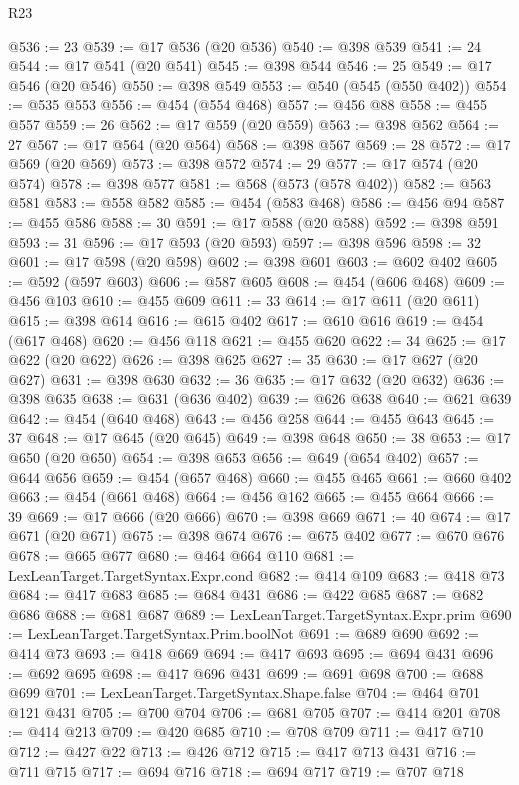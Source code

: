 \begin{lexlean}{R23}
\begin{coremodule}
{{{{{{{{{{{{{{{{{{{{{{{{{{{{{{{{{{{{{{{{{{{{{{{{{{{{{{{{{{{{{{{{{{{{{{{{{{{{{{{{{{{{{{{{{{{{{@536 := 23
@539 := @17 @536 (@20 @536)
@540 := @398 @539
@541 := 24
@544 := @17 @541 (@20 @541)
@545 := @398 @544
@546 := 25
@549 := @17 @546 (@20 @546)
@550 := @398 @549
@553 := @540 (@545 (@550 @402))
@554 := @535 @553
@556 := @454 (@554 @468)
@557 := @456 @88
@558 := @455 @557
@559 := 26
@562 := @17 @559 (@20 @559)
@563 := @398 @562
@564 := 27
@567 := @17 @564 (@20 @564)
@568 := @398 @567
@569 := 28
@572 := @17 @569 (@20 @569)
@573 := @398 @572
@574 := 29
@577 := @17 @574 (@20 @574)
@578 := @398 @577
@581 := @568 (@573 (@578 @402))
@582 := @563 @581
@583 := @558 @582
@585 := @454 (@583 @468)
@586 := @456 @94
@587 := @455 @586
@588 := 30
@591 := @17 @588 (@20 @588)
@592 := @398 @591
@593 := 31
@596 := @17 @593 (@20 @593)
@597 := @398 @596
@598 := 32
@601 := @17 @598 (@20 @598)
@602 := @398 @601
@603 := @602 @402
@605 := @592 (@597 @603)
@606 := @587 @605
@608 := @454 (@606 @468)
@609 := @456 @103
@610 := @455 @609
@611 := 33
@614 := @17 @611 (@20 @611)
@615 := @398 @614
@616 := @615 @402
@617 := @610 @616
@619 := @454 (@617 @468)
@620 := @456 @118
@621 := @455 @620
@622 := 34
@625 := @17 @622 (@20 @622)
@626 := @398 @625
@627 := 35
@630 := @17 @627 (@20 @627)
@631 := @398 @630
@632 := 36
@635 := @17 @632 (@20 @632)
@636 := @398 @635
@638 := @631 (@636 @402)
@639 := @626 @638
@640 := @621 @639
@642 := @454 (@640 @468)
@643 := @456 @258
@644 := @455 @643
@645 := 37
@648 := @17 @645 (@20 @645)
@649 := @398 @648
@650 := 38
@653 := @17 @650 (@20 @650)
@654 := @398 @653
@656 := @649 (@654 @402)
@657 := @644 @656
@659 := @454 (@657 @468)
@660 := @455 @465
@661 := @660 @402
@663 := @454 (@661 @468)
@664 := @456 @162
@665 := @455 @664
@666 := 39
@669 := @17 @666 (@20 @666)
@670 := @398 @669
@671 := 40
@674 := @17 @671 (@20 @671)
@675 := @398 @674
@676 := @675 @402
@677 := @670 @676
@678 := @665 @677
@680 := @464 @664 @110
@681 := LexLeanTarget.TargetSyntax.Expr.cond
@682 := @414 @109
@683 := @418 @73
@684 := @417 @683
@685 := @684 @431
@686 := @422 @685
@687 := @682 @686
@688 := @681 @687
@689 := LexLeanTarget.TargetSyntax.Expr.prim
@690 := LexLeanTarget.TargetSyntax.Prim.boolNot
@691 := @689 @690
@692 := @414 @73
@693 := @418 @669
@694 := @417 @693
@695 := @694 @431
@696 := @692 @695
@698 := @417 @696 @431
@699 := @691 @698
@700 := @688 @699
@701 := LexLeanTarget.TargetSyntax.Shape.false
@704 := @464 @701 @121 @431
@705 := @700 @704
@706 := @681 @705
@707 := @414 @201
@708 := @414 @213
@709 := @420 @685
@710 := @708 @709
@711 := @417 @710
@712 := @427 @22
@713 := @426 @712
@715 := @417 @713 @431
@716 := @711 @715
@717 := @694 @716
@718 := @694 @717
@719 := @707 @718
}}}}}}}}}}}}}}}}}}}}}}}}}}}}}}}}}}}}}}}}}}}}}}}}}}}}}}}}}}}}}}}}}}}}}}}}}}}}}}}}}}}}}}}}}}}}}
\end{coremodule}
\end{lexlean}
